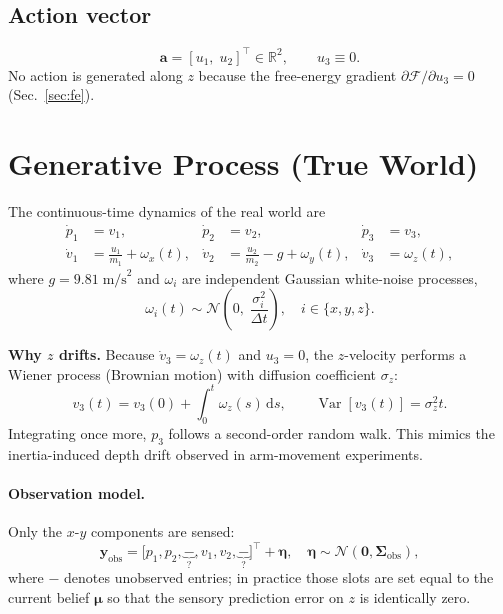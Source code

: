 \documentclass[11pt, a4paper]{article}
\newcommand{\vect}[1]{\bm{#1}}
\newcommand{\mat}[1]{\mathbf{#1}}
\newcommand{\FE}{\mathcal{F}}
\begin{document}
\subsection{Action vector}
\begin{equation}
  \vect{a} = [u_1,\; u_2]^\top \in \mathbb{R}^2, \qquad u_3 \equiv 0.
\end{equation}
No action is generated along $z$ because the free-energy gradient
$\partial\FE/\partial u_3 = 0$ (Sec.~\ref{sec:fe}).

\section{Generative Process (True World)}
\label{sec:gp}

The continuous-time dynamics of the real world are
\begin{align}
  \dot{p}_1 &= v_1, & \dot{p}_2 &= v_2, & \dot{p}_3 &= v_3,\\[4pt]
  \dot{v}_1 &= \frac{u_1}{m_1} + \omega_x(t), &
  \dot{v}_2 &= \frac{u_2}{m_2} - g + \omega_y(t), &
  \dot{v}_3 &= \omega_z(t),
\end{align}
where $g = 9.81\;\text{m/s}^2$ and $\omega_i$ are independent Gaussian white-noise
processes,
\begin{equation}
  \omega_i(t) \sim \mathcal{N}\!\left(0,\;\frac{\sigma_i^2}{\Delta t}\right), \quad i\in\{x,y,z\}.
\end{equation}

\begin{notebox}
\textbf{Why $z$ drifts.}
Because $\dot{v}_3 = \omega_z(t)$ and $u_3 = 0$, the $z$-velocity performs
a Wiener process (Brownian motion) with diffusion coefficient $\sigma_z$:
\[
  v_3(t) = v_3(0) + \int_0^t \omega_z(s)\,\mathrm{d}s,\qquad
  \operatorname{Var}[v_3(t)] = \sigma_z^2 t.
\]
Integrating once more, $p_3$ follows a second-order random walk.
This mimics the inertia-induced depth drift observed in arm-movement experiments.
\end{notebox}

\paragraph{Observation model.}
Only the $x$-$y$ components are sensed:
\begin{equation}
  \vect{y}_{\text{obs}} = \bigl[p_1, p_2, \underbrace{-}_{?}, v_1, v_2, \underbrace{-}_{?}\bigr]^\top
    + \vect{\eta}, \quad
  \vect{\eta}\sim\mathcal{N}(\mathbf{0}, \mat{\Sigma}_{\text{obs}}),
\end{equation}
where $-$ denotes unobserved entries; in practice those slots are set equal to
the current belief $\vect{\mu}$ so that the sensory prediction error on $z$
is identically zero.
\end{document}
